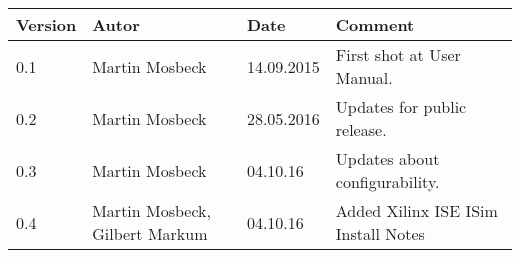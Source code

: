 
\begin{table}[h]
\begin{tabular*}{14.7cm}{|p{}|p{}|p{2cm}|p{}|}
\hline 
Version & Autor & Date & Comment \\[2pt]
\hline
\hline

0.1 & Martin Mosbeck & 14.09.2015 & First shot at User Manual. \\[2pt]
\hline 
0.2 & Martin Mosbeck & 28.05.2016 & Updates for public release. \\[2pt]
\hline 
0.3 & Martin Mosbeck & 04.10.16 & Updates about configurability. \\[2pt]
\hline 
0.4 & Martin Mosbeck, Gilbert Markum & 04.10.16 & Added Xilinx ISE ISim Install Notes \\[2pt]
\hline 
\end{tabular*}
\end{table}

